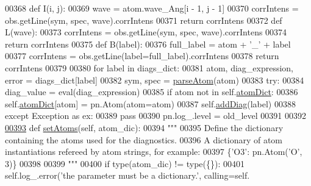 \begin{DoxyCode}
00368         \textcolor{keyword}{def }I(i, j):
00369             wave = atom.wave\_Ang[i - 1, j - 1]
00370             corrIntens = obs.getLine(sym, spec, wave).corrIntens
00371             \textcolor{keywordflow}{return} corrIntens
00372         \textcolor{keyword}{def }L(wave):
00373             corrIntens = obs.getLine(sym, spec, wave).corrIntens
00374             \textcolor{keywordflow}{return} corrIntens
00375         \textcolor{keyword}{def }B(label):
00376             full\_label = atom + \textcolor{stringliteral}{'\_'} + label
00377             corrIntens = obs.getLine(label=full\_label).corrIntens
00378             \textcolor{keywordflow}{return} corrIntens
00379         
00380         \textcolor{keywordflow}{for} label \textcolor{keywordflow}{in} diags\_dict:
00381             atom, diag\_expression, error = diags\_dict[label]
00382             sym, spec = \hyperlink{namespacepyneb_1_1utils_1_1misc_a8c069186002a3e73dd474958e35034d5}{parseAtom}(atom)
00383             \textcolor{keywordflow}{try}:
00384                 diag\_value = eval(diag\_expression)
00385                 \textcolor{keywordflow}{if} atom \textcolor{keywordflow}{not} \textcolor{keywordflow}{in} self.\hyperlink{classpyneb_1_1core_1_1diags_1_1_diagnostics_a36301f268745b33abe6cfeb3e41a6356}{atomDict}:
00386                     self.\hyperlink{classpyneb_1_1core_1_1diags_1_1_diagnostics_a36301f268745b33abe6cfeb3e41a6356}{atomDict}[atom] = pn.Atom(atom=atom)
00387                 self.\hyperlink{classpyneb_1_1core_1_1diags_1_1_diagnostics_a508fa9c5a2216f9eb4128338c33a6f75}{addDiag}(label)
00388             \textcolor{keywordflow}{except} Exception \textcolor{keyword}{as} ex:
00389                 \textcolor{keywordflow}{pass}
00390         pn.log\_.level = old\_level
00391     
00392     
\hypertarget{diags_8py_source_l00393}{}\hyperlink{classpyneb_1_1core_1_1diags_1_1_diagnostics_a01ad01e336115e86eada60350060bb9b}{00393}     \textcolor{keyword}{def }\hyperlink{classpyneb_1_1core_1_1diags_1_1_diagnostics_a01ad01e336115e86eada60350060bb9b}{setAtoms}(self, atom\_dic):
00394         \textcolor{stringliteral}{"""}
00395 \textcolor{stringliteral}{        Define the dictionary containing the atoms used for the diagnostics.}
00396 \textcolor{stringliteral}{        A dictionary of atom instantiations refereed by atom strings, for example:}
00397 \textcolor{stringliteral}{        \{'O3': pn.Atom('O', 3)\}}
00398 \textcolor{stringliteral}{        }
00399 \textcolor{stringliteral}{        """}
00400         \textcolor{keywordflow}{if} type(atom\_dic) != type(\{\}):
00401             self.log\_.error(\textcolor{stringliteral}{'the parameter must be a dictionary.'}, calling=self.

\end{DoxyCode}
